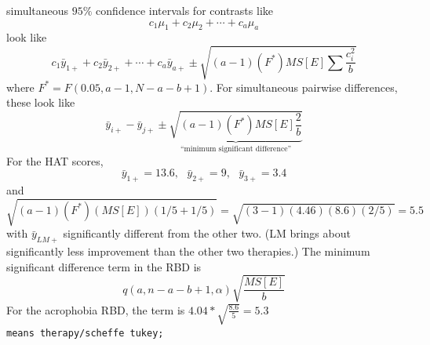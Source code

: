 \bigkn
\bigkn
{} simultaneous $95\%$ confidence intervals for contrasts 
like \\
$$c_1 \mu_1 + c_2 \mu_2 + \cdots + c_a \mu_a$$
look like
$$c_1 \bar{y}_{1+} + c_2 \bar{y}_{2+} + \cdots + c_a \bar{y}_{a+}
\pm \sqrt{(a-1)(F^*)MS[E]\sum \frac{c_i^2}{b}}$$
where $F^{*}=F(0.05,a-1,N-a-b+1)$.
For simultaneous pairwise differences, these look like
$$\bar{y}_{i+} - \bar{y}_{j+}
\pm \underbrace{\sqrt{(a-1)(F^*)MS[E]\frac{2}{b}}}_{\mbox{``minimum significant difference''}}$$
\bigkn
%
For the HAT scores, 
$$ \bar{y}_{1+}=13.6,\ \ \ \bar{y}_{2+}=9,\ \ \ \bar{y}_{3+}=3.4$$
and
$$ \sqrt{(a-1)(F^*)(MS[E])(1/5+1/5)}=\sqrt{(3-1)(4.46)(8.6)(2/5)}=5.5$$
with $\bar{y}_{LM+}$ significantly different from the other two.
(LM brings about significantly less improvement than
the other two therapies.)
\bigkn
\bigkn
The  minimum significant difference term in the RBD is 
$$ q(a,n-a-b+1,\alpha) \sqrt{\frac{MS[E]}{b}}$$
For the acrophobia RBD, the term is
$ 4.04*\sqrt{\frac{8.6}{5}}=5.3$ \\
{\tt means therapy/scheffe tukey;}
